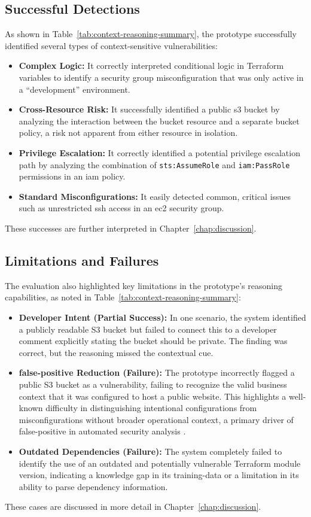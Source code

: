 \subsection{Successful Detections}
As shown in Table~\ref{tab:context-reasoning-summary}, the prototype successfully identified several types of context-sensitive vulnerabilities:
\begin{itemize}
    \item \textbf{Complex Logic:} It correctly interpreted conditional logic in Terraform variables to identify a security group misconfiguration that was only active in a ``development'' environment.
    \item \textbf{Cross-Resource Risk:} It successfully identified a public \gls{s3} bucket by analyzing the interaction between the bucket resource and a separate bucket policy, a risk not apparent from either resource in isolation.
    \item \textbf{Privilege Escalation:} It correctly identified a potential privilege escalation path by analyzing the combination of \texttt{sts:AssumeRole} and \texttt{iam:PassRole} permissions in an \gls{iam} policy.
    \item \textbf{Standard Misconfigurations:} It easily detected common, critical issues such as unrestricted \gls{ssh} access in an \gls{ec2} security group.
\end{itemize}
These successes are further interpreted in Chapter~\ref{chap:discussion}.

\subsection{Limitations and Failures}
The evaluation also highlighted key limitations in the prototype's reasoning capabilities, as noted in Table~\ref{tab:context-reasoning-summary}:
\begin{itemize}
    \item \textbf{Developer Intent (Partial Success):} In one scenario, the system identified a publicly readable S3 bucket but failed to connect this to a developer comment explicitly stating the bucket should be private. The finding was correct, but the reasoning missed the contextual cue.
    \item \textbf{\gls{false-positive} Reduction (Failure):} The prototype incorrectly flagged a public S3 bucket as a vulnerability, failing to recognize the valid business context that it was configured to host a public website. This highlights a well-known difficulty in distinguishing intentional configurations from misconfigurations without broader operational context, a primary driver of \gls{false-positive} in automated security analysis \cite{zheng_context-aware_2023}.
    \item \textbf{Outdated Dependencies (Failure):} The system completely failed to identify the use of an outdated and potentially vulnerable Terraform module version, indicating a knowledge gap in its \gls{training-data} or a limitation in its ability to parse dependency information.
\end{itemize}
These cases are discussed in more detail in Chapter~\ref{chap:discussion}.

